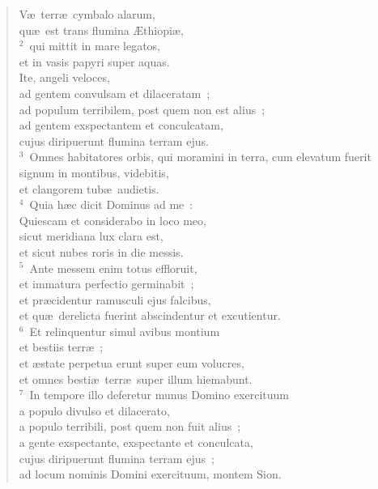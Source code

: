 \begin{flushleft}\begin{verse}\vspace{-19pt}\hspace{6pt}V\ae\ terr\ae\ cymbalo alarum,\\\hspace{6pt} qu\ae\ est trans flumina \AE thiopi\ae ,\\
${}^{2}$~qui mittit in mare legatos,\\ et in vasis papyri super aquas.\\ Ite, angeli veloces,\\ ad gentem convulsam et dilaceratam~;\\ ad populum terribilem, post quem non est alius~;\\ ad gentem exspectantem et conculcatam,\\ cujus diripuerunt flumina terram ejus.\\
${}^{3}$~Omnes habitatores orbis, qui moramini in terra, cum elevatum fuerit signum in montibus, videbitis,\\ et clangorem tub\ae\ audietis.\\
${}^{4}$~Quia h\ae c dicit Dominus ad me~:\\ Quiescam et considerabo in loco meo,\\ sicut meridiana lux clara est,\\ et sicut nubes roris in die messis.\\
${}^{5}$~Ante messem enim totus effloruit,\\ et immatura perfectio germinabit~;\\ et pr\ae cidentur ramusculi ejus falcibus,\\ et qu\ae\ derelicta fuerint abscindentur et excutientur.\\
${}^{6}$~Et relinquentur simul avibus montium\\ et bestiis terr\ae~;\\ et \ae state perpetua erunt super eum volucres,\\ et omnes besti\ae\ terr\ae\ super illum hiemabunt.\\
${}^{7}$~In tempore illo deferetur munus Domino exercituum\\ a populo divulso et dilacerato,\\ a populo terribili, post quem non fuit alius~;\\ a gente exspectante, exspectante et conculcata,\\ cujus diripuerunt flumina terram ejus~;\\ ad locum nominis Domini exercituum, montem Sion.\end{verse}\end{flushleft}



